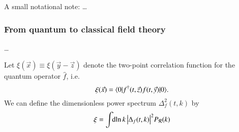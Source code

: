 







A small notational note: \dots


\subsubsection{From quantum to classical field theory}
    \dots


    Let $\xi(\vec{x}) \equiv \xi(\vec{y}-\vec{z})$ denote the two-point correlation function for the quantum operator $\hat{f}$, i.e.
    \begin{equation}
        \xi(\vec{x}) = \langle  0 | f^\dagger(t,\vec{z}) f(t, \vec{y}) |  0 \rangle.
    \end{equation}
    We can define the dimensionless power spectrum $\Delta_f^2(t, k)$ by
    \begin{equation}
        \xi = \int \!\!\mathop{}\!\mathrm{d} {\ln{k}}\, \abs{\Delta_f(t,k)}^2 P_\mathcal{R}(k)
    \end{equation}










